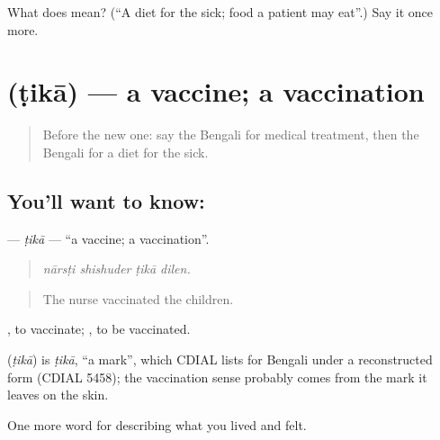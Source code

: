 \begin{tcolorbox}[breakable,colback=teal!4,colframe=teal!35!black,title={Before you move on}]
What does  mean? (\textquotedblleft{}A diet for the sick; food a patient may eat\textquotedblright{}.) Say it once more.
\end{tcolorbox}
\section[\texorpdfstring{\bn{টিকা} (ṭikā)}{টিকা (ṭikā)}]{ (ṭikā) — a vaccine; a vaccination}

\label{lesson:BN-C472-tika}



\begin{quote}
Before the new one: say the Bengali for medical treatment, then the Bengali for a diet for the sick.
\end{quote}

\subsection*{You'll want to know: }
\textbf{} — \emph{ṭikā} — \textquotedblleft{}a vaccine; a vaccination\textquotedblright{}.

\begin{quote}
   
\end{quote}

\begin{quote}
\emph{nārsṭi shishuder ṭikā dilen.}
\end{quote}

\begin{quote}
The nurse vaccinated the children.
\end{quote}

 , to vaccinate;  , to be vaccinated.

\begin{cousinweb}
\textbf{} (\emph{ṭikā}) is \emph{ṭikā}, \textquotedblleft{}a mark\textquotedblright{}, which CDIAL lists for Bengali under a reconstructed form (CDIAL 5458); the vaccination sense probably comes from the mark it leaves on the skin.
\end{cousinweb}

\begin{grammarlens}[title={What you've built}]
One more word for describing what you lived and felt.
\end{grammarlens}

